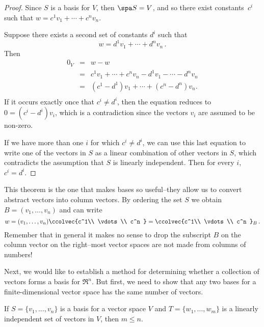 \begin{proof}
Since $S$ is a basis for $V$, then $\spa S=V$, and so there exist constants~$c^i$ such that $w=c^1v_1+\cdots + c^nv_n$.

Suppose there exists a second set of constants $d^i$ such that 
\[w=d^1v_1+\cdots + d^nv_n\, .\]  Then
\begin{eqnarray*}
0_V&=&w-w\\
&=&c^1v_1+\cdots + c^nv_n-d^1v_1-\cdots - d^nv_n \\[1mm]
&=&(c^1-d^1)v_1+\cdots + (c^n-d^n)v_n. \\
\end{eqnarray*}
If it occurs exactly once that $c^i\neq d^i$, then the equation reduces to $0=(c^i-d^i)v_i$, which is a contradiction since the vectors $v_i$ are assumed to be non-zero.

If we have more than one $i$ for which $c^i\neq d^i$, we can use this last equation to write one of the vectors in $S$ as a linear combination of other vectors in $S$, which contradicts the assumption that $S$ is linearly independent.  Then for every $i$, $c^i=d^i$.
\end{proof}


\begin{remark}
This theorem is the one that makes bases so useful--they allow us to convert abstract vectors into column vectors.
By ordering the set $S$ we obtain $B=(v_1,\ldots,v_n)$ and can write
\[
w=(v_1,\ldots,v_n) \ccolvec{c^1\\ \vdots\\ c^n }=\ccolvec{c^1\\ \vdots\\ c^n }_B\, .
\]
Remember that in general it makes no sense to drop the subscript $B$ on the column vector on the right--most vector spaces  are not made from  columns of numbers!
\end{remark}


Next, we would like to establish a method for determining whether a collection of vectors forms a basis for $\Re^n$.  But first, we need to show that any two bases for a finite-dimensional vector space has the same number of vectors.

\begin{lemma}\label{mlessn}
If $S=\{v_1, \ldots, v_n \}$ is a basis for a vector space $V$ and $T=\{w_1, \ldots, w_m \}$ is a linearly independent set of vectors in $V$, then $m\leq n$.
\end{lemma}


